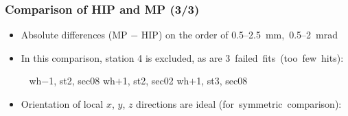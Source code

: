 \documentclass[compress]{beamer}
\begin{document}
\begin{frame}
\frametitle{Comparison of HIP and MP (3/3)}

\begin{itemize}\scriptsize
\item Absolute differences (MP $-$ HIP) on the order of \mbox{0.5--2.5~mm, 0.5--2~mrad\hspace{-1 cm}}
\item In this comparison, station 4 is excluded, as are \mbox{3 failed fits {\scriptsize (too few hits)}:\hspace{-1 cm}}

\mbox{ } \hfill wh$-$1, st2, sec08 \hfill wh$+$1, st2, sec02 \hfill wh$+$1, st3, sec08 \hfill \mbox{ }

\item Orientation of local $x$, $y$, $z$ directions are ideal \mbox{{\scriptsize (for symmetric comparison)}:\hspace{-1 cm}}
\end{itemize}


\end{frame}
\end{document}
